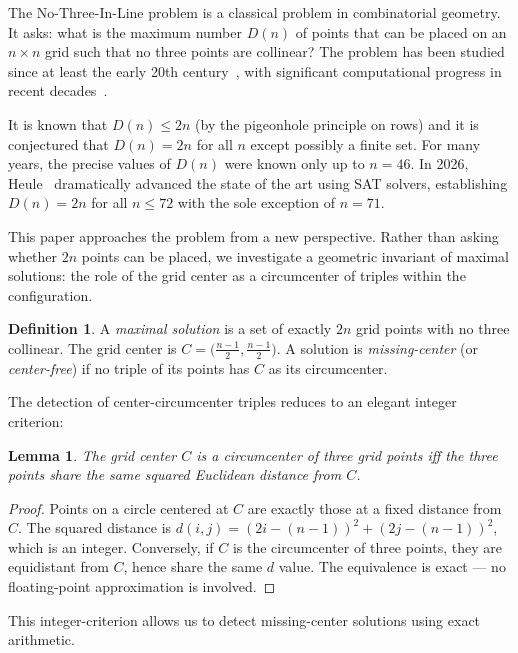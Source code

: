 \documentclass[11pt,a4paper]{article}
\theoremstyle{plain}
\newtheorem{lemma}[theorem]{Lemma}
\theoremstyle{definition}
\newtheorem{definition}[theorem]{Definition}
\begin{document}
The No-Three-In-Line problem is a classical problem in combinatorial geometry. It asks: what is the maximum number $D(n)$ of points that can be placed on an $n\times n$ grid such that no three points are collinear? The problem has been studied since at least the early 20th century~\cite{erdos1935}, with significant computational progress in recent decades~\cite{guy1994,flammenkamp}.

It is known that $D(n) \le 2n$ (by the pigeonhole principle on rows) and it is conjectured that $D(n) = 2n$ for all $n$ except possibly a finite set. For many years, the precise values of $D(n)$ were known only up to $n=46$. In 2026, Heule~\cite{heule2026} dramatically advanced the state of the art using SAT solvers, establishing $D(n)=2n$ for all $n\le 72$ with the sole exception of $n=71$.

This paper approaches the problem from a new perspective. Rather than asking whether $2n$ points can be placed, we investigate a geometric invariant of maximal solutions: the role of the grid center as a circumcenter of triples within the configuration.

\begin{definition}
A \emph{maximal solution} is a set of exactly $2n$ grid points with no three collinear. The grid center is $C = \bigl(\frac{n-1}{2},\frac{n-1}{2}\bigr)$. A solution is \emph{missing-center} (or \emph{center-free}) if no triple of its points has $C$ as its circumcenter.
\end{definition}

The detection of center-circumcenter triples reduces to an elegant integer criterion:

\begin{lemma}
\label{lem:distance}
The grid center $C$ is a circumcenter of three grid points iff the three points share the same squared Euclidean distance from $C$.
\end{lemma}

\begin{proof}
Points on a circle centered at $C$ are exactly those at a fixed distance from $C$. The squared distance is $d(i,j) = (2i-(n-1))^2 + (2j-(n-1))^2$, which is an integer. Conversely, if $C$ is the circumcenter of three points, they are equidistant from $C$, hence share the same $d$ value. The equivalence is exact --- no floating-point approximation is involved.
\end{proof}

\noindent This integer-criterion allows us to detect missing-center solutions using exact arithmetic.
\end{document}
